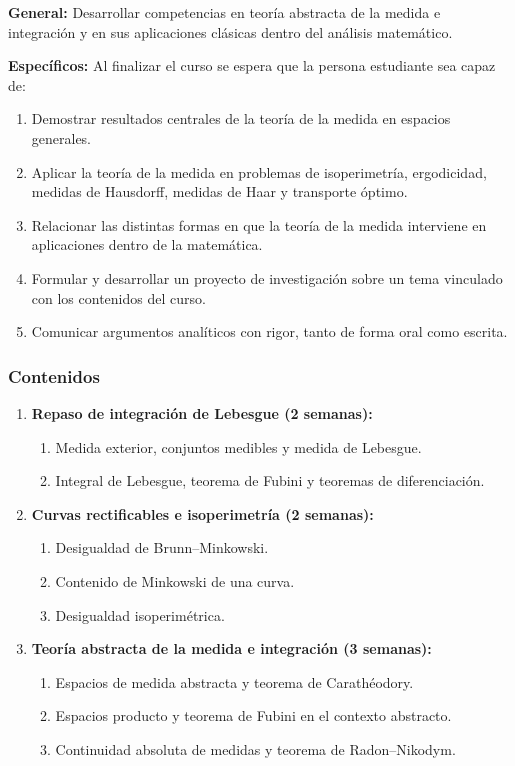 \begin{refsection}
\textbf{General:} Desarrollar competencias en teoría abstracta de la medida e integración y en sus aplicaciones clásicas dentro del análisis matemático.

\textbf{Específicos:} Al finalizar el curso se espera que la persona estudiante sea capaz de:

\begin{enumerate}
\item Demostrar resultados centrales de la teoría de la medida en espacios generales.
\item Aplicar la teoría de la medida en problemas de isoperimetría, ergodicidad, medidas de Hausdorff, medidas de Haar y transporte óptimo.
\item Relacionar las distintas formas en que la teoría de la medida interviene en aplicaciones dentro de la matemática.
\item Formular y desarrollar un proyecto de investigación sobre un tema vinculado con los contenidos del curso.
\item Comunicar argumentos analíticos con rigor, tanto de forma oral como escrita.
\end{enumerate}

\subsubsection*{Contenidos}

\begin{enumerate}

\item \textbf{Repaso de integración de Lebesgue (2 semanas):}
\begin{enumerate}
    \item Medida exterior, conjuntos medibles y medida de Lebesgue.
    \item Integral de Lebesgue, teorema de Fubini y teoremas de diferenciación.
\end{enumerate}

\item \textbf{Curvas rectificables e isoperimetría (2 semanas):}
\begin{enumerate}
    \item Desigualdad de Brunn--Minkowski.
    \item Contenido de Minkowski de una curva.
    \item Desigualdad isoperimétrica.
\end{enumerate}

\item \textbf{Teoría abstracta de la medida e integración (3 semanas):}
\begin{enumerate}
    \item Espacios de medida abstracta y teorema de Carathéodory.
    \item Espacios producto y teorema de Fubini en el contexto abstracto.
    \item Continuidad absoluta de medidas y teorema de Radon--Nikodym.
\end{enumerate}


\end{enumerate}
\end{refsection}
